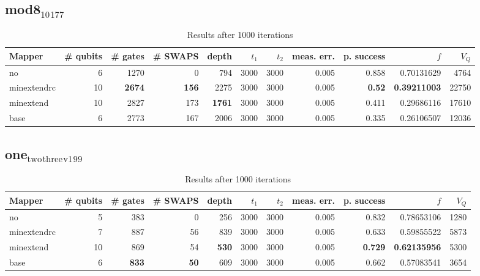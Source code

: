 \documentclass[11pt]{article}
\begin{document}
\subsection{mod8\(_{\text{10}}\)\(_{\text{177}}\)}
\label{sec:org47bd546}
\begin{table}[H]
\caption{\label{tab:org5d2895b}
Results after 1000 iterations}
\centering
\small
\begin{tabular}{lrrrrrrrrrr}
\hline
Mapper & \# qubits & \# gates & \# SWAPS & depth & \(t_1\) & \(t_2\) & meas. err. & p. success & \(f\) & \(V_Q\)\\
\hline
no & 6 & 1270 & 0 & 794 & 3000 & 3000 & 0.005 & 0.858 & 0.70131629 & 4764\\
\hline
minextendrc & 10 & \textbf{2674} & \textbf{156} & 2275 & 3000 & 3000 & 0.005 & \textbf{0.52} & \textbf{0.39211003} & 22750\\
minextend & 10 & 2827 & 173 & \textbf{1761} & 3000 & 3000 & 0.005 & 0.411 & 0.29686116 & 17610\\
base & 6 & 2773 & 167 & 2006 & 3000 & 3000 & 0.005 & 0.335 & 0.26106507 & 12036\\
\hline
\end{tabular}
\end{table}
\subsection{one\(_{\text{two}}\)\(_{\text{three}}\)\(_{\text{v1}}\)\(_{\text{99}}\)}
\label{sec:orgb10092d}
\begin{table}[H]
\caption{\label{tab:orga1a2404}
Results after 1000 iterations}
\centering
\small
\begin{tabular}{lrrrrrrrrrr}
\hline
Mapper & \# qubits & \# gates & \# SWAPS & depth & \(t_1\) & \(t_2\) & meas. err. & p. success & \(f\) & \(V_Q\)\\
\hline
no & 5 & 383 & 0 & 256 & 3000 & 3000 & 0.005 & 0.832 & 0.78653106 & 1280\\
\hline
minextendrc & 7 & 887 & 56 & 839 & 3000 & 3000 & 0.005 & 0.633 & 0.59855522 & 5873\\
minextend & 10 & 869 & 54 & \textbf{530} & 3000 & 3000 & 0.005 & \textbf{0.729} & \textbf{0.62135956} & 5300\\
base & 6 & \textbf{833} & \textbf{50} & 609 & 3000 & 3000 & 0.005 & 0.662 & 0.57083541 & 3654\\
\hline
\end{tabular}
\end{table}
\end{document}
